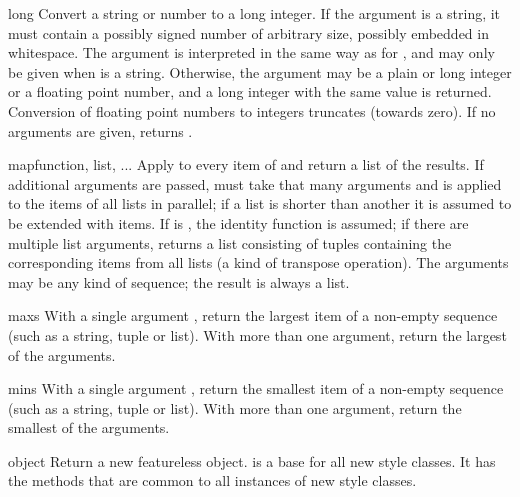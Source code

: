 \begin{funcdesc}{long}{}
  Convert a string or number to a long integer.  If the argument is a
  string, it must contain a possibly signed number of
  arbitrary size, possibly embedded in whitespace. The
   argument is interpreted in the same way as for
  , and may only be given when  is a string.
  Otherwise, the argument may be a plain or
  long integer or a floating point number, and a long integer with
  the same value is returned.    Conversion of floating
  point numbers to integers truncates (towards zero).  If no arguments
  are given, returns .
\end{funcdesc}

\begin{funcdesc}{map}{function, list, ...}
  Apply  to every item of  and return a list
  of the results.  If additional  arguments are passed,
   must take that many arguments and is applied to the
  items of all lists in parallel; if a list is shorter than another it
  is assumed to be extended with  items.  If 
  is , the identity function is assumed; if there are
  multiple list arguments,  returns a list consisting
  of tuples containing the corresponding items from all lists (a kind
  of transpose operation).  The  arguments may be any kind
  of sequence; the result is always a list.
\end{funcdesc}

\begin{funcdesc}{max}{s}
  With a single argument , return the largest item of a
  non-empty sequence (such as a string, tuple or list).  With more
  than one argument, return the largest of the arguments.
\end{funcdesc}

\begin{funcdesc}{min}{s}
  With a single argument , return the smallest item of a
  non-empty sequence (such as a string, tuple or list).  With more
  than one argument, return the smallest of the arguments.
\end{funcdesc}

\begin{funcdesc}{object}{}
  Return a new featureless object.   is a base 
  for all new style classes.  It has the methods that are common
  to all instances of new style classes.

\end{funcdesc}

